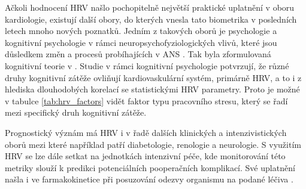 Ačkoli hodnocení HRV našlo pochopitelně největší praktické uplatnění v oboru
kardiologie, existují další obory, do kterých vnesla tato biometrika v
posledních letech mnoho nových poznatků. Jedním z takových oborů je psychologie
a kognitivní psychologie v rámci neuropsychofyziologických vlivů, které jsou
důsledkem změn a procesů probíhajících v ANS \cite{Bernardi2009}. Tak byla
zformulovaná kognitivní teorie v \cite{Forte2019,Plass2010}. Studie v rámci
kognitivní psychologie
\cite{Bernardi2009,Solhjoo2019,Salahuddin2007,Ishaque2020} potvrzují, že různé
druhy kognitivní zátěže ovliňují kardiovaskulární systém, primárně HRV, a to i z
hlediska dlouhodobých korelací se statistickými HRV parametry. Proto je možné v
tabulce \ref{tab:hrv_factors} vidět faktor typu pracovního stresu, který se řadí
mezi specifický druh kognitivní zátěže.

Prognostický význám má HRV i v řadě dalších klinických a intenzivistických oborů
mezi které například patří diabetologie, renologie a neurologie. S využitím HRV
se lze dále setkat na jednotkách intenzivní péče, kde monitorování této metriky
slouží k predikci potenciálních pooperačních komplikací. Své uplatnění našla i
ve farmakokinetice při posuzování odezvy organismu na podané léčiva
\cite{Pumprla2014}.

